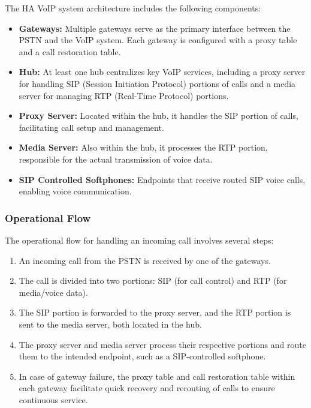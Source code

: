 \documentclass[12pt]{article}
\begin{document}
The HA VoIP system architecture includes the following components:

\begin{itemize}
    \item \textbf{Gateways:} Multiple gateways serve as the primary interface between the PSTN and the VoIP system. Each gateway is configured with a proxy table and a call restoration table.
    \item \textbf{Hub:} At least one hub centralizes key VoIP services, including a proxy server for handling SIP (Session Initiation Protocol) portions of calls and a media server for managing RTP (Real-Time Protocol) portions.
    \item \textbf{Proxy Server:} Located within the hub, it handles the SIP portion of calls, facilitating call setup and management.
    \item \textbf{Media Server:} Also within the hub, it processes the RTP portion, responsible for the actual transmission of voice data.
    \item \textbf{SIP Controlled Softphones:} Endpoints that receive routed SIP voice calls, enabling voice communication.
\end{itemize}

\subsubsection{Operational Flow}

The operational flow for handling an incoming call involves several steps:

\begin{enumerate}
    \item An incoming call from the PSTN is received by one of the gateways.
    \item The call is divided into two portions: SIP (for call control) and RTP (for media/voice data).
    \item The SIP portion is forwarded to the proxy server, and the RTP portion is sent to the media server, both located in the hub.
    \item The proxy server and media server process their respective portions and route them to the intended endpoint, such as a SIP-controlled softphone.
    \item In case of gateway failure, the proxy table and call restoration table within each gateway facilitate quick recovery and rerouting of calls to ensure continuous service.
\end{enumerate}
\end{document}
